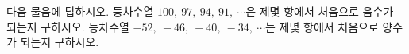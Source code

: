 다음 물음에 답하시오.
 등차수열 $100,\ 97,\ 94,\ 91,\ \cdots$은 제몇 항에서 처음으로 음수가 되는지 구하시오.
 등차수열 $-52,\ -46,\ -40,\ -34,\ \cdots$는 제몇 항에서 처음으로 양수가 되는지 구하시오.
